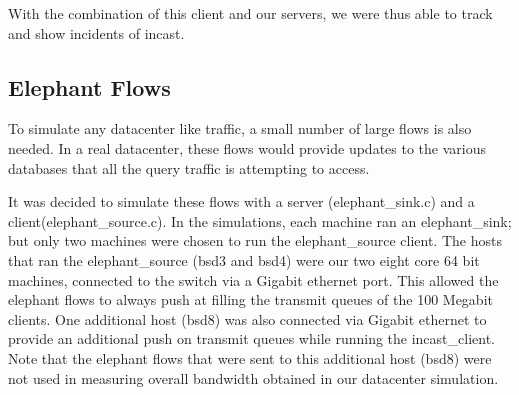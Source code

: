 \documentclass[12pt]{article}
\begin{document}
With the combination of this client and our servers, we were thus able to track and show incidents
of incast.

\newpage

\subsection{Elephant Flows}
\label{elephants}
To simulate any datacenter like traffic, a small number of large flows is also needed. In a
real datacenter, these flows would provide updates to the various databases that all the query traffic is attempting to access. 

It was decided to simulate these flows
with a server (elephant\_sink.c) and a client(elephant\_source.c). In the simulations, each machine ran
an elephant\_sink; but only two machines were chosen to run the elephant\_source client. The hosts
that ran the elephant\_source (bsd3 and bsd4) were our two eight core 64 bit machines, connected to the switch
via a Gigabit ethernet port. This allowed the elephant flows to always push at filling the transmit queues
of the 100 Megabit clients. One additional host (bsd8) was also connected via Gigabit ethernet to provide
an additional push on transmit queues while running the incast\_client. Note that the elephant flows that
were sent to this additional host (bsd8) were not used in measuring overall bandwidth obtained 
in our datacenter simulation.
\\
\end{document}
